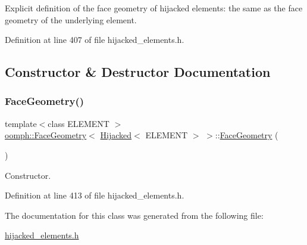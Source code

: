 Explicit definition of the face geometry of hijacked elements\+: the same as the face geometry of the underlying element. 

Definition at line 407 of file hijacked\+\_\+elements.\+h.



\subsection{Constructor \& Destructor Documentation}
\mbox{\label{classoomph_1_1FaceGeometry_3_01Hijacked_3_01ELEMENT_01_4_01_4_aa15ca241abd8d8c44efffac9b710a13f}} 
\subsubsection{\texorpdfstring{Face\+Geometry()}{FaceGeometry()}}
{\footnotesize\ttfamily template$<$class E\+L\+E\+M\+E\+NT $>$ \\
\hyperlink{classoomph_1_1FaceGeometry}{oomph\+::\+Face\+Geometry}$<$ \hyperlink{classoomph_1_1Hijacked}{Hijacked}$<$ E\+L\+E\+M\+E\+NT $>$ $>$\+::\hyperlink{classoomph_1_1FaceGeometry}{Face\+Geometry} (\begin{DoxyParamCaption}{ }\end{DoxyParamCaption})\hspace{0.3cm}{\ttfamily [inline]}}



Constructor. 



Definition at line 413 of file hijacked\+\_\+elements.\+h.



The documentation for this class was generated from the following file\+:\begin{DoxyCompactItemize}
\item 
\hyperlink{hijacked__elements_8h}{hijacked\+\_\+elements.\+h}\end{DoxyCompactItemize}
